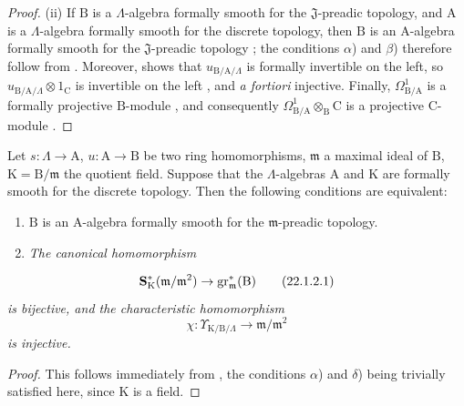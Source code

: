 \begin{proof}
(ii) If $\mathrm{B}$ is a $\Lambda$-algebra formally smooth for the $\mathfrak{J}$-preadic topology, and $\mathrm{A}$ is a $\Lambda$-algebra formally smooth for the discrete topology, then $\mathrm{B}$ is an $\mathrm{A}$-algebra formally smooth for the $\mathfrak{J}$-preadic topology ; the conditions $\alpha$) and $\beta$) therefore follow from . Moreover,  shows that $u_{\mathrm{B}/\mathrm{A}/\Lambda}$ is formally invertible on the left, so $u_{\mathrm{B}/\mathrm{A}/\Lambda}\otimes 1_\mathrm{C}$ is invertible on the left , and \emph{a fortiori} injective. Finally, $\Omega^1_{\mathrm{B}/\mathrm{A}}$ is a formally projective $\mathrm{B}$-module , and consequently $\Omega^1_{\mathrm{B}/\mathrm{A}}\otimes_\mathrm{B}\mathrm{C}$ is a projective $\mathrm{C}$-module .
\end{proof}

\begin{corollary}[22.1.2]
\label{0.22.1.2}
Let $s:\Lambda\to\mathrm{A}$, $u:\mathrm{A}\to\mathrm{B}$ be two ring homomorphisms, $\mathfrak{m}$ a maximal ideal of $\mathrm{B}$, $\mathrm{K}=\mathrm{B}/\mathfrak{m}$ the quotient field.
Suppose that the $\Lambda$-algebras $\mathrm{A}$ and $\mathrm{K}$ are formally smooth for the discrete topology.
Then the following conditions are equivalent:
\begin{enumerate}
  \item[a)] $\mathrm{B}$ is an $\mathrm{A}$-algebra formally smooth for the $\mathfrak{m}$-preadic topology.
  \item[b)] \emph{The canonical homomorphism}
\end{enumerate}
\[
\label{0.22.1.2.1}
  \mathbf{S}^*_\mathrm{K}(\mathfrak{m}/\mathfrak{m}^2)\to\operatorname{gr}^*_\mathfrak{m}(\mathrm{B})
  \tag{22.1.2.1}
\]
\emph{is bijective, and the characteristic homomorphism}
\[
\label{0.22.1.2.2}
  \chi:\Upsilon_{\mathrm{K}/\mathrm{B}/\Lambda}\to\mathfrak{m}/\mathfrak{m}^2
  \tag{22.1.2.2}
\]
\emph{is injective.}
\end{corollary}

\begin{proof}
This follows immediately from , the conditions $\alpha$) and $\delta$) being trivially satisfied here, since $\mathrm{K}$ is a field.
\end{proof}

